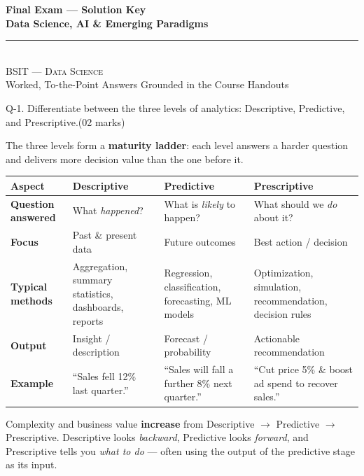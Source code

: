 \documentclass[11pt,a4paper]{article}
\newcommand{\question}[3][05 marks]{%
  \begin{qbox}#2\hfill\textcolor{accent}{(#1)}\\[2pt]#3\end{qbox}%
}
\begin{document}
\begin{center}
\vspace*{0.3cm}
{\Huge\bfseries\textcolor{primary}{Final Exam --- Solution Key}}\\[8pt]
{\Large\bfseries\textcolor{primary}{Data Science, AI \& Emerging Paradigms}}\\[14pt]
{\color{secondary}\rule{0.6\textwidth}{1.5pt}}\\[12pt]
{\Large\textsc{BSIT --- Data Science}}\\[6pt]
{\large\textcolor{gray!70!black}{Worked, To-the-Point Answers Grounded in the Course Handouts}}
\vspace{0.2cm}
\end{center}

\question[02 marks]{Q-1. Differentiate between the three levels of analytics: Descriptive, Predictive, and Prescriptive.}{}

The three levels form a \textbf{maturity ladder}: each level answers a harder question and delivers more decision value than the one before it.

\begin{center}
\begin{tabular}{@{}>{\bfseries}p{2.6cm}p{3.4cm}p{4.0cm}p{4.0cm}@{}}
\toprule
\rowcolor{primary!15}
\textbf{Aspect} & \textbf{Descriptive} & \textbf{Predictive} & \textbf{Prescriptive} \\
\midrule
Question answered & What \emph{happened}? & What is \emph{likely} to happen? & What should we \emph{do} about it? \\
Focus & Past \& present data & Future outcomes & Best action / decision \\
Typical methods & Aggregation, summary statistics, dashboards, reports & Regression, classification, forecasting, ML models & Optimization, simulation, recommendation, decision rules \\
Output & Insight / description & Forecast / probability & Actionable recommendation \\
Example & ``Sales fell 12\% last quarter.'' & ``Sales will fall a further 8\% next quarter.'' & ``Cut price 5\% \& boost ad spend to recover sales.'' \\
\bottomrule
\end{tabular}
\end{center}

\begin{conceptbox}
Complexity and business value \textbf{increase} from Descriptive $\rightarrow$ Predictive $\rightarrow$ Prescriptive. Descriptive looks \emph{backward}, Predictive looks \emph{forward}, and Prescriptive tells you \emph{what to do} --- often using the output of the predictive stage as its input.
\end{conceptbox}
\end{document}
